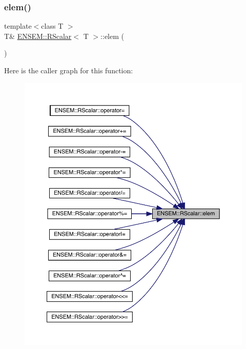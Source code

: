 \subsubsection{\texorpdfstring{elem()}{elem()}\hspace{0.1cm}{\footnotesize\ttfamily [1/4]}}
{\footnotesize\ttfamily template$<$class T $>$ \\
T\& \mbox{\hyperlink{classENSEM_1_1RScalar}{E\+N\+S\+E\+M\+::\+R\+Scalar}}$<$ T $>$\+::elem (\begin{DoxyParamCaption}{ }\end{DoxyParamCaption})\hspace{0.3cm}{\ttfamily [inline]}}

Here is the caller graph for this function\+:\nopagebreak
\begin{figure}[H]
\begin{center}
\leavevmode
\includegraphics[width=350pt]{d0/d8c/classENSEM_1_1RScalar_ac1e3c3dba2379fdcea237f7c2bbb1e0e_icgraph}
\end{center}
\end{figure}
\mbox{\label{classENSEM_1_1RScalar_ac1e3c3dba2379fdcea237f7c2bbb1e0e}} 
